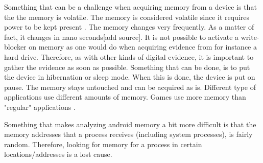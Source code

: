 Something that can be a challenge when acquiring memory from a device is that the the memory is volatile.
The memory is considered volatile since it requires power to be kept present \cite{the_art_of_mem}.
The memory changes very frequently. As a matter of fact, it changes in nano seconds[add source].
It is not possible to activate a write-blocker on memory as one would do when acquiring evidence from for
instance a hard drive. Therefore, as with other kinds of digital evidence, it is important to
gather the evidence as soon as possible. Something that can be done, is to put the device in hibernation or sleep mode.
When this is done, the device is put on pause. The memory stays untouched and can be acquired as is.
Different type of applications use different amounts of memory. Games use more memory than "regular" applications \cite{}.

Something that makes analyzing android memory a bit more difficult is that the memory addresses that a process
receives (including system processes), is fairly random. Therefore, looking for memory for a process in certain
locations/addresses is a lost cause. %



%
%

